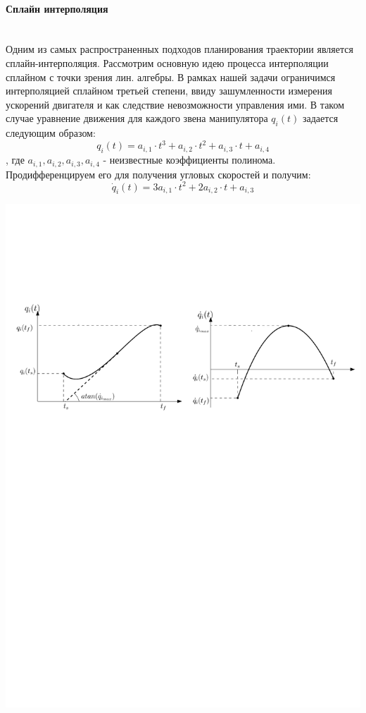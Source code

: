 \paragraph*{Сплайн интерполяция}$\phantom{-}$\\

Одним из самых распространенных подходов планирования траектории является сплайн-интерполяция. Рассмотрим основную идею процесса интерполяции сплайном с точки зрения лин. алгебры. В рамках нашей задачи ограничимся интерполяцией сплайном третьей степени, ввиду зашумленности измерения ускорений двигателя и как следствие невозможности управления ими. В таком случае уравнение движения для каждого звена манипулятора $q_i(t)$ задается следующим образом:
\begin{equation}\label{eq:model}
q_i(t)=a_{i,1}\cdot t^3  + a_{i,2}\cdot t^2 + a_{i,3}\cdot t + a_{i,4}
\end{equation}
, где $a_{i,1}, a_{i,2}, a_{i,3}, a_{i,4}$ - неизвестные коэффициенты полинома.
Продифференцируем его для получения угловых скоростей и получим:
\begin{equation}\label{eq:model}
\dot{q}_i(t)=3a_{i,1}\cdot t^2  + 2a_{i,2}\cdot t + a_{i,3}
\end{equation}


\begin{center}
    \includegraphics[width=\textwidth]{Lab4/images/cubicTrjPlanning.pdf}\\
\end{center}


